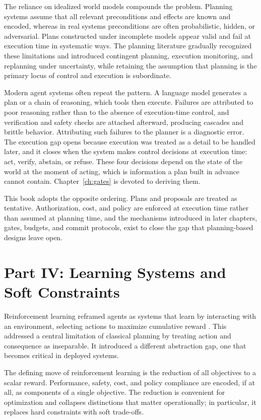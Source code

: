 \documentclass[11pt]{book}
\begin{document}
The reliance on idealized world models compounds the problem. Planning systems assume that all relevant preconditions and effects are known and encoded, whereas in real systems preconditions are often probabilistic, hidden, or adversarial. Plans constructed under incomplete models appear valid and fail at execution time in systematic ways. The planning literature gradually recognized these limitations and introduced contingent planning, execution monitoring, and replanning under uncertainty, while retaining the assumption that planning is the primary locus of control and execution is subordinate.

Modern agent systems often repeat the pattern. A language model generates a plan or a chain of reasoning, which tools then execute. Failures are attributed to poor reasoning rather than to the absence of execution-time control, and verification and safety checks are attached afterward, producing cascades and brittle behavior. Attributing such failures to the planner is a diagnostic error. The execution gap opens because execution was treated as a detail to be handled later, and it closes when the system makes control decisions at execution time: act, verify, abstain, or refuse. These four decisions depend on the state of the world at the moment of acting, which is information a plan built in advance cannot contain. Chapter~\ref{ch:gates} is devoted to deriving them.

This book adopts the opposite ordering. Plans and proposals are treated as tentative. Authorization, cost, and policy are enforced at execution time rather than assumed at planning time, and the mechanisms introduced in later chapters, gates, budgets, and commit protocols, exist to close the gap that planning-based designs leave open.

\section{Part IV: Learning Systems and Soft Constraints}

Reinforcement learning reframed agents as systems that learn by interacting with an environment, selecting actions to maximize cumulative reward \cite{sutton2018reinforcement}. This addressed a central limitation of classical planning by treating action and consequence as inseparable. It introduced a different abstraction gap, one that becomes critical in deployed systems.

The defining move of reinforcement learning is the reduction of all objectives to a scalar reward. Performance, safety, cost, and policy compliance are encoded, if at all, as components of a single objective. The reduction is convenient for optimization and collapses distinctions that matter operationally; in particular, it replaces hard constraints with soft trade-offs.
\end{document}
